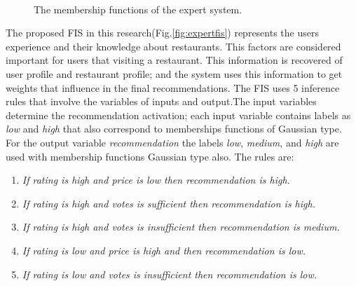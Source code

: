 \begin{figure}[ht!]
   \centering
   \hspace{0.1\linewidth}
   \\[20pt]
    \hspace{0.1\linewidth}
   \caption{The membership functions of the expert system.
   }
   \label{fig:mfexpert} 
\end{figure}

The proposed FIS in this research(Fig.\ref{fig:expertfis}) represents
the users experience and their knowledge about restaurants. This
factors are considered important  for users that visiting a
restaurant. This information is recovered of user profile and
restaurant profile; and the system uses this information to get
weights that influence in the final recommendations. The FIS uses 5
inference rules that involve the variables of inputs and output.The
input variables determine the recommendation activation; each input
variable contains labels as \textit{low} and \textit{high} that also
correspond to memberships functions of Gaussian type. For the output
variable \textit{recommendation} the labels \textit{low},
\textit{medium}, and \textit{high} are used with membership functions
Gaussian type also. The rules are:

\begin{enumerate} 
\item \textit{If rating is high and price is low then 
recommendation is high.}
\item \textit{If rating is high and votes is sufficient then 
recommendation is high.}
\item \textit{If rating is high and votes is insufficient then 
recommendation is medium.}
\item \textit{If rating is low and price is high and then 
recommendation is low.} 
\item \textit{If rating is low and votes is insufficient then 
recommendation is low.}
\end{enumerate} 

